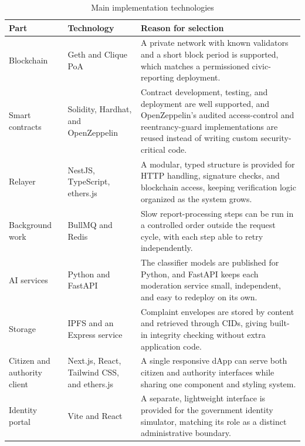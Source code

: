 \begin{table}[!htbp]
    \centering
    \caption{Main implementation technologies}
    \label{tab:technology-choices}
    \small
    \begin{tabular}{p{}|p{}|p{}}
        
        Part & Technology & Reason for selection \\
        \hline
        Blockchain & Geth and Clique PoA & A private network with known validators and a short block period is supported, which matches a permissioned civic-reporting deployment. \\
        \hline
        Smart contracts & Solidity, Hardhat, and OpenZeppelin & Contract development, testing, and deployment are well supported, and OpenZeppelin's audited access-control and reentrancy-guard implementations are reused instead of writing custom security-critical code. \\
        \hline
        Relayer & NestJS, TypeScript, ethers.js & A modular, typed structure is provided for HTTP handling, signature checks, and blockchain access, keeping verification logic organized as the system grows. \\
        \hline
        Background work & BullMQ and Redis & Slow report-processing steps can be run in a controlled order outside the request cycle, with each step able to retry independently. \\
        \hline
        AI services & Python and FastAPI & The classifier models are published for Python, and FastAPI keeps each moderation service small, independent, and easy to redeploy on its own. \\
        \hline
        Storage & IPFS and an Express service & Complaint envelopes are stored by content and retrieved through CIDs, giving built-in integrity checking without extra application code. \\
        \hline
        Citizen and authority client & Next.js, React, Tailwind CSS, and ethers.js & A single responsive dApp can serve both citizen and authority interfaces while sharing one component and styling system. \\
        \hline
        Identity portal & Vite and React & A separate, lightweight interface is provided for the government identity simulator, matching its role as a distinct administrative boundary. \\
        
    \end{tabular}
\end{table}

